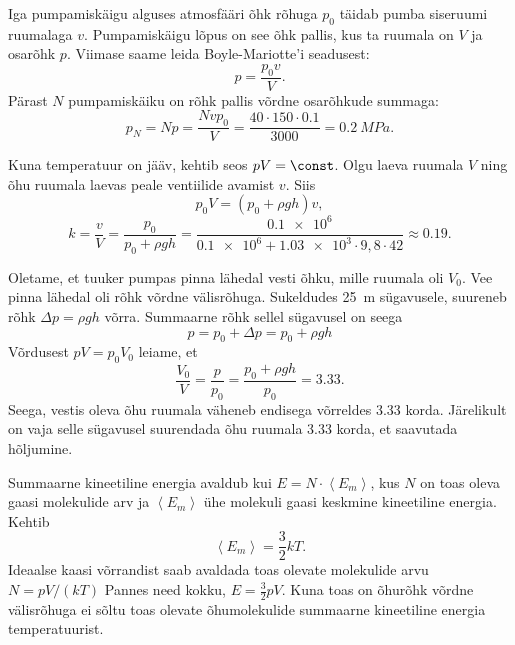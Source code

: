 \documentclass[10pt, twoside]{article}
\begin{document}
{
\solu
Iga pumpamiskäigu alguses atmosfääri õhk rõhuga $p_0$ täidab pumba siseruumi ruumalaga $v$. Pumpamiskäigu lõpus on see õhk pallis, kus ta ruumala on $V$ ja osarõhk $p$. Viimase saame leida Boyle-Mariotte’i seadusest:
\[
p = \frac{p_0v}{V}.
\]
Pärast $N$ pumpamiskäiku on rõhk pallis võrdne osarõhkude summaga:
\[
p_{N}=N p=\frac{N v p_{0}}{V}=\frac{40 \cdot 150 \cdot \num{0,1}}{3000}=\SI{0,2}{MPa}.
\]
\probend
\bigskip


\solu
Kuna temperatuur on jääv, kehtib seos $pV = \const$. Olgu laeva ruumala $V$ ning õhu ruumala laevas peale ventiilide avamist $v$. Siis
\[
p_{0} V=\left(p_{0}+\rho g h\right) v,
\]
\[
k=\frac{v}{V}=\frac{p_{0}}{p_{0}+\rho g h}=\frac{\num{0,1e6}}{\num{0,1e6}+\num{1,03e3} \cdot 9,8 \cdot 42} \approx \num{0,19}.
\]
\probend
\bigskip


\solu
Oletame, et tuuker pumpas pinna lähedal vesti õhku, mille ruumala oli $V_0$. Vee pinna lähedal oli rõhk võrdne välisrõhuga. Sukeldudes \SI{25}{m} sügavusele, suureneb rõhk $\Delta p = \rho gh$ võrra. Summaarne rõhk sellel sügavusel on seega
\[
p=p_{0}+\Delta p=p_{0}+\rho g h
\]
Võrdusest $pV=p_0V_0$ leiame, et
\[
\frac{V_{0}}{V}=\frac{p}{p_{0}}=\frac{p_{0}+\rho g h}{p_{0}}=\num{3,33}.
\]
Seega, vestis oleva õhu ruumala väheneb endisega võrreldes \num{3,33} korda. Järelikult on vaja selle sügavusel suurendada õhu ruumala \num{3,33} korda, et saavutada hõljumine.
\probend
\bigskip


\solu
Summaarne kineetiline energia avaldub kui $E = N \cdot \left\langle E_m\right\rangle$, kus $N$ on toas oleva gaasi molekulide arv ja $\left\langle E_m\right\rangle$ ühe molekuli gaasi keskmine kineetiline energia. Kehtib
\[
\left\langle E_{m}\right\rangle=\frac{3}{2} k T.
\]
Ideaalse kaasi võrrandist saab avaldada toas olevate molekulide arvu $N = pV /(kT)$ Pannes need kokku, $E = \frac{3}{2} pV$. Kuna toas on õhurõhk võrdne välisrõhuga ei sõltu toas olevate õhumolekulide summaarne kineetiline energia temperatuurist.
\probend
\bigskip

}
\end{document}
